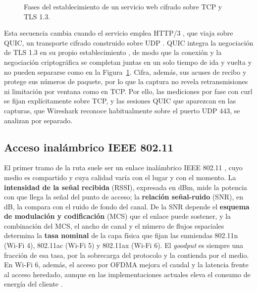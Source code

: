 \begin{figure}[htbp]
  \centering
  
  \caption{Fases del establecimiento de un servicio web cifrado sobre TCP y TLS 1.3.}
  \label{fig:fases_servicio}
  \raggedright
\end{figure}

Esta secuencia cambia cuando el servicio emplea HTTP/3 \cite{rfc9114}, que viaja sobre QUIC, un transporte cifrado construido sobre UDP \cite{rfc9000}. QUIC integra la negociación de TLS 1.3 en su propio establecimiento \cite{rfc9001}, de modo que la conexión y la negociación criptográfica se completan juntas en un solo tiempo de ida y vuelta y no pueden separarse como en la Figura~\ref{fig:fases_servicio}. Cifra, además, sus acuses de recibo y protege sus números de paquete, por lo que la captura no revela retransmisiones ni limitación por ventana como en TCP. Por ello, las mediciones por fase con curl se fijan explícitamente sobre TCP, y las sesiones QUIC que aparezcan en las capturas, que Wireshark reconoce habitualmente sobre el puerto UDP 443, se analizan por separado.

\subsection{Acceso inalámbrico IEEE 802.11}

El primer tramo de la ruta suele ser un enlace inalámbrico IEEE 802.11 \cite{ieee80211}, cuyo medio es compartido y cuya calidad varía con el lugar y con el momento. La \textbf{intensidad de la señal recibida} (RSSI), expresada en dBm, mide la potencia con que llega la señal del punto de acceso; la \textbf{relación señal-ruido} (SNR), en dB, la compara con el ruido de fondo del canal. De la SNR depende el \textbf{esquema de modulación y codificación} (MCS) que el enlace puede sostener, y la combinación del MCS, el ancho de canal y el número de flujos espaciales determina la \textbf{tasa nominal} de la capa física que fijan las enmiendas 802.11n (Wi-Fi 4), 802.11ac (Wi-Fi 5) y 802.11ax (Wi-Fi 6). El \textit{goodput} es siempre una fracción de esa tasa, por la sobrecarga del protocolo y la contienda por el medio. En Wi-Fi 6, además, el acceso por OFDMA mejora el caudal y la latencia frente al acceso heredado, aunque en las implementaciones actuales eleva el consumo de energía del cliente \cite{liu2023wifi6}.

